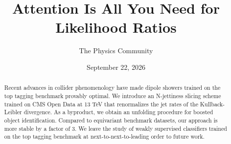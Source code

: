 \documentclass[11pt]{article}
\title{Attention Is All You Need for Likelihood Ratios}
\author{The Physics Community}
\date{September 22, 2026}
\numberwithin{equation}{section}
\theoremstyle{definition}
\theoremstyle{remark}
\begin{document}
\maketitle
\begin{abstract}
Recent advances in collider phenomenology have made dipole showers
trained on the top tagging benchmark provably optimal. We introduce an
N-jettiness slicing scheme trained on CMS Open Data at 13 TeV that
renormalizes the jet rates of the Kullback-Leibler divergence. As a
byproduct, we obtain an unfolding procedure for boosted object
identification. Compared to equivariant benchmark datasets, our approach
is more stable by a factor of 3. We leave the study of weakly supervised
classifiers trained on the top tagging benchmark at
next-to-next-to-leading order to future work.
\end{abstract}
\tableofcontents




\nocite{*}


\end{document}
